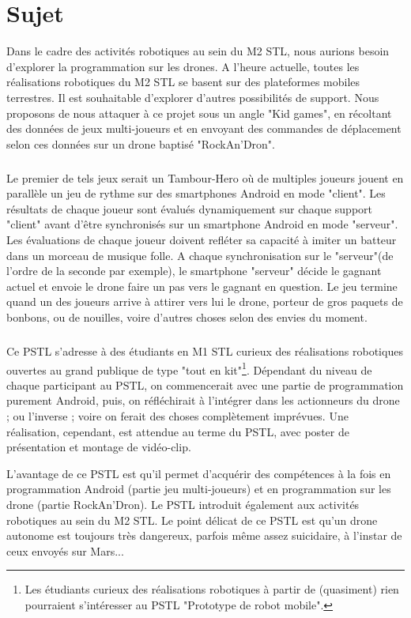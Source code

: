 \chapter{Sujet}
Dans le cadre des activités robotiques au sein du M2 STL, nous aurions besoin d’explorer la programmation sur les drones. A l’heure actuelle, toutes les réalisations robotiques du M2 STL se basent sur des plateformes mobiles terrestres. Il est souhaitable d’explorer d’autres possibilités de support. Nous proposons de nous attaquer à ce projet sous un angle "Kid games", en récoltant des données de jeux multi-joueurs et en envoyant des commandes de déplacement selon ces données sur un drone baptisé "RockAn’Dron".

\paragraph{}
Le premier de tels jeux serait un Tambour-Hero où de multiples joueurs jouent en parallèle un jeu de rythme sur des smartphones Android en mode "client". Les résultats de chaque joueur sont évalués dynamiquement sur chaque support "client" avant d’être synchronisés sur un smartphone Android en mode "serveur". Les évaluations de chaque joueur doivent refléter sa capacité à imiter un batteur dans un morceau de musique folle. A chaque synchronisation sur le "serveur"(de l’ordre de la seconde par exemple), le smartphone "serveur" décide le gagnant actuel et envoie le drone faire un pas vers le gagnant en question. Le jeu termine quand un des joueurs arrive à attirer vers lui le drone, porteur de gros paquets de bonbons, ou de nouilles, voire d’autres choses selon des envies du moment.

\paragraph{}
Ce PSTL s’adresse à des étudiants en M1 STL curieux des réalisations robotiques ouvertes au grand publique de type "tout en kit"\footnote{Les étudiants curieux des réalisations robotiques à partir de (quasiment) rien pourraient s’intéresser au PSTL "Prototype de robot mobile".}. Dépendant du niveau de chaque participant au PSTL, on commencerait avec une partie de programmation purement Android, puis, on réfléchirait à l’intégrer dans les actionneurs du drone ; ou l’inverse ; voire on ferait des choses complètement imprévues. Une réalisation, cependant, est attendue au terme du PSTL, avec poster de présentation et montage de vidéo-clip.

\newpage
L’avantage de ce PSTL est qu’il permet d’acquérir des compétences à la fois en programmation Android (partie jeu multi-joueurs) et en programmation sur les drone (partie RockAn’Dron). Le PSTL introduit également aux activités robotiques au sein du M2 STL. Le point délicat de ce PSTL est qu’un drone autonome est toujours très dangereux, parfois même assez suicidaire, à l’instar de ceux envoyés sur Mars...